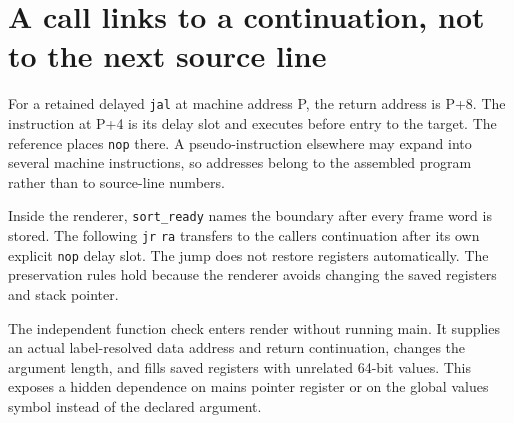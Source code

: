 \section{A call links to a continuation, not to the next source
  line}\label{009-sorting-visualizer-p03-a-call-links-to-a-continuation-not-to-the-next-source-line}

For a retained delayed \texttt{jal} at machine address P, the return
address is P+8. The instruction at P+4 is its delay slot and executes
before entry to the target. The reference places \texttt{nop} there. A
pseudo-instruction elsewhere may expand into several machine
instructions, so addresses belong to the assembled program rather than
to source-line numbers.

Inside the renderer, \texttt{sort\_ready} names the boundary after every
frame word is stored. The following \texttt{jr} \texttt{ra} transfers to
the caller\textquotesingle s continuation after its own explicit
\texttt{nop} delay slot. The jump does not restore registers
automatically. The preservation rules hold because the renderer avoids
changing the saved registers and stack pointer.

The independent function check enters render without running main. It
supplies an actual label-resolved data address and return continuation,
changes the argument length, and fills saved registers with unrelated
64-bit values. This exposes a hidden dependence on
main\textquotesingle s pointer register or on the global values symbol
instead of the declared argument.
